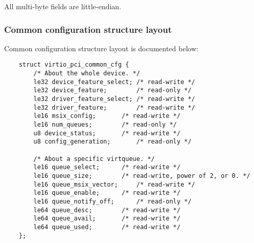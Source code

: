 All multi-byte fields are little-endian.

\subsubsection{Common configuration structure layout}\label{sec:Virtio Transport Options / Virtio Over PCI Bus / PCI Device Layout / Common configuration structure layout}
Common configuration structure layout is documented below:

\begin{lstlisting}
	struct virtio_pci_common_cfg {
		/* About the whole device. */
		le32 device_feature_select;	/* read-write */
		le32 device_feature;		/* read-only */
		le32 driver_feature_select;	/* read-write */
		le32 driver_feature;		/* read-write */
		le16 msix_config;		/* read-write */
		le16 num_queues;		/* read-only */
		u8 device_status;		/* read-write */
		u8 config_generation;		/* read-only */

		/* About a specific virtqueue. */
		le16 queue_select;		/* read-write */
		le16 queue_size;		/* read-write, power of 2, or 0. */
		le16 queue_msix_vector;		/* read-write */
		le16 queue_enable;		/* read-write */
		le16 queue_notify_off;		/* read-only */
		le64 queue_desc;		/* read-write */
		le64 queue_avail;		/* read-write */
		le64 queue_used;		/* read-write */
	};
\end{lstlisting}

